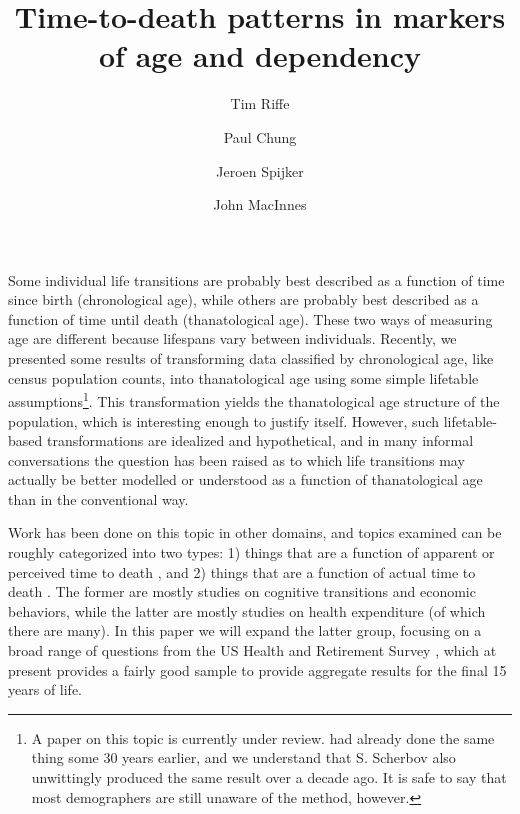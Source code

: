 \documentclass{article}
\begin{document}
\title{Time-to-death patterns in markers of age and dependency}

\author[1]{Tim Riffe}
\author[1]{Paul Chung}
\author[2,3]{Jeroen Spijker}
\author[4]{John MacInnes}

\maketitle

Some individual life transitions are probably best described as a function of
time since birth (chronological age), while others are probably best described as a
function of time until death (thanatological age). These two ways of
measuring age are different because lifespans vary between individuals.
Recently, we presented some results of transforming
data classified by chronological age, like census population counts, into
thanatological age using some simple lifetable
assumptions\footnote{\citep{riffe2014paaposter} A paper on this topic is
currently under review. \citet{brouard1986structure, brouard1989mouvements}
had already done the same thing some 30 years earlier, and we understand that
S. Scherbov also unwittingly produced the same result over a decade ago. It is
safe to say that most demographers are still unaware of the method, however.}.
This transformation yields the thanatological age structure of the population,
which is interesting enough to justify itself. However, such lifetable-based
transformations are idealized and hypothetical, and in many informal
conversations the question has been raised as to which life transitions
may actually be better modelled or understood as a function of thanatological
age than in the conventional way.

Work has been done on this topic in other domains, and
topics examined can be roughly categorized into two types: 1) things that are a
function of apparent or perceived time to death
\citep{carstensen2006influence,gan2004subjective,salm2010subjective,van2010living}, and 2) things that are a function of actual time to death
\citep{miller2001increasing,seshamani2004longitudinal}. The former are mostly
studies on cognitive transitions and economic behaviors, while the latter are
mostly studies on health expenditure (of which there are many). In this paper we
will expand the latter group, focusing on a broad range of questions from the US
Health and Retirement Survey \citep{HRS}, which at present provides a fairly
good sample to provide aggregate results for the final 15 years of life.
\end{document}
